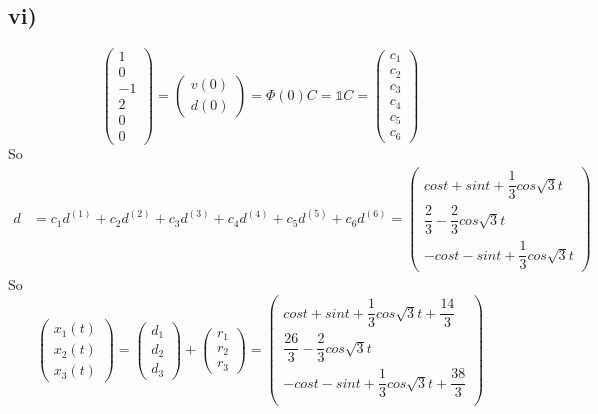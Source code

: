 \documentclass[a4paper,12pt,titlepage]{article}
\begin{document}
\subsection*{vi)}
$$\begin{pmatrix}
1\\
0\\
-1\\
2\\
0\\
0
\end{pmatrix}=\begin{pmatrix}
v(0)\\
d(0)
\end{pmatrix}=\Phi(0)C=\mathds{1}C=\begin{pmatrix}
c_1\\
c_2\\
c_3\\
c_4\\
c_5\\
c_6
\end{pmatrix}$$
So
\begin{align*}
d&=c_1d^{(1)}+c_2d^{(2)}+c_3d^{(3)}+c_4d^{(4)}+c_5d^{(5)}+c_6d^{(6)}=\begin{pmatrix}
cost+sint+\dfrac{1}{3}cos\sqrt{3}t\\
\dfrac{2}{3}-\dfrac{2}{3}cos\sqrt{3}t\\
-cost-sint+\dfrac{1}{3}cos\sqrt{3}t
\end{pmatrix}
\end{align*}
So
$$\begin{pmatrix}
x_1(t)\\
x_2(t)\\
x_3(t)
\end{pmatrix}=\begin{pmatrix}
d_1\\
d_2\\
d_3
\end{pmatrix}+\begin{pmatrix}
r_1\\
r_2\\
r_3
\end{pmatrix}=\begin{pmatrix}
cost+sint+\dfrac{1}{3}cos\sqrt{3}t+\dfrac{14}{3}\\
\dfrac{26}{3}-\dfrac{2}{3}cos\sqrt{3}t\\
-cost-sint+\dfrac{1}{3}cos\sqrt{3}t+\dfrac{38}{3}\\
\end{pmatrix}$$
\end{document}
